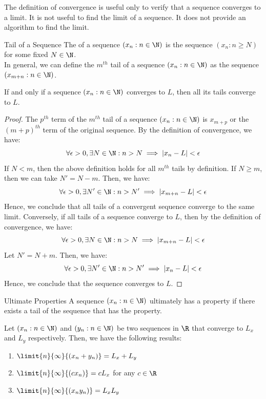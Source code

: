 \documentclass[openany]{book}
\begin{document}
\begin{mynote}
    The definition of convergence is useful only to verify that a sequence converges to a limit. It is not useful to find the limit of a sequence. It does not provide an algorithm to find the limit. 
\end{mynote}
\begin{mydefinition}{Tail of a Sequence}
    The  of a sequence $(x_n : n \in \N)$ is the sequence $(x_n : n \geq N)$ for some fixed $N \in \N$. \\
    In general, we can define the $m^{th}$ tail of a sequence $(x_n : n \in \N)$ as the sequence $(x_{m+n} : n \in \N)$.
\end{mydefinition}
\begin{mytheorem}
    If and only if a sequence $(x_n : n \in \N)$ converges to $L$, then all its tails converge to $L$. 
\end{mytheorem}
\begin{proof}
    The $p^{th}$ term of the $m^{th}$ tail of a sequence $(x_n : n \in \N)$ is $x_{m+p}$ or the $(m+p)^{th}$ term of the original sequence. 
    By the definition of convergence, we have:
    $$\forall \epsilon > 0, \exists N \in \N: n > N \implies |x_n - L| < \epsilon$$
    If $N< m$, then the above definition holds for all $m^{th}$ tails by definition. 
    If $N \geq m$, then we can take $N' = N - m$. Then, we have:
    $$\forall \epsilon > 0, \exists N' \in \N: n > N' \implies |x_{m+n} - L| < \epsilon$$
    Hence, we conclude that all tails of a convergent sequence converge to the same limit.
    Conversely, if all tails of a sequence converge to $L$, then by the definition of convergence, we have:
    $$\forall \epsilon > 0, \exists N \in \N: n > N \implies |x_{m+n} - L| < \epsilon$$
    Let $N' = N + m$. Then, we have:
    $$\forall \epsilon > 0, \exists N' \in \N: n > N' \implies |x_n - L| < \epsilon$$
    Hence, we conclude that the sequence converges to $L$.
\end{proof}
\begin{mydefinition}{Ultimate Properties}
    A sequence $(x_n : n \in \N)$ ultimately has a property if there exists a tail of the sequence that has the property.
\end{mydefinition}
\begin{mytheorem}
    Let $(x_n : n \in \N)$ and $(y_n : n \in \N)$ be two sequences in $\R$ that converge to $L_x$ and $L_y$ respectively. Then, we have the following results:
    \begin{enumerate}
        \item $\limit{n}{\infty}{(x_n + y_n)} = L_x + L_y$
        \item $\limit{n}{\infty}{(cx_n)} = c L_x$ for any $c \in \R$
        \item $\limit{n}{\infty}{(x_n y_n)} = L_x L_y$
    \end{enumerate}
\end{mytheorem}
\end{document}
